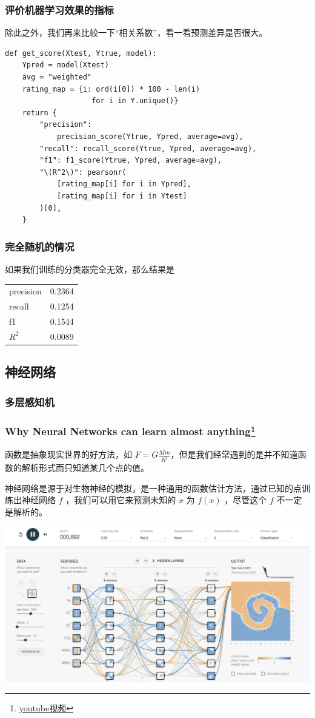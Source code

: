 \documentclass{ctexbeamer}
\begin{document}
\begin{frame}[fragile]
    \frametitle{评价机器学习效果的指标}
    除此之外，我们再来比较一下“相关系数”，看一看预测差异是否很大。
    \begin{verbatim}
def get_score(Xtest, Ytrue, model):
    Ypred = model(Xtest)
    avg = "weighted"
    rating_map = {i: ord(i[0]) * 100 - len(i)
                    for i in Y.unique()}
    return {
        "precision":
            precision_score(Ytrue, Ypred, average=avg),
        "recall": recall_score(Ytrue, Ypred, average=avg),
        "f1": f1_score(Ytrue, Ypred, average=avg),
        "\(R^2\)": pearsonr(
            [rating_map[i] for i in Ypred],
            [rating_map[i] for i in Ytest]
        )[0],
    }
\end{verbatim}
\end{frame}
\begin{frame}
    \frametitle{完全随机的情况}
    如果我们训练的分类器完全无效，那么结果是
    \begin{center}
        \begin{tabular}{ll}
            precision & 0.2364 \\
            recall    & 0.1254 \\
            f1        & 0.1544 \\
            \(R^2\)   & 0.0089 \\
        \end{tabular}
    \end{center}
\end{frame}
\subsection{神经网络}
\subsubsection{多层感知机}
\begin{frame}
    \frametitle{Why Neural Networks can learn almost anything\footnote{\href{https://www.youtube.com/watch?v=0QczhVg5HaI}{youtube视频}}}
    函数是抽象现实世界的好方法，如 \(\displaystyle F=G\frac{Mm}{R^2}\)，但是我们经常遇到的是并不知道函数的解析形式而只知道某几个点的值。

    神经网络是源于对生物神经的模拟，是一种通用的函数估计方法\cite{hornik1989multilayer}，通过已知的点训练出神经网络 $f$ ，我们可以用它来预测未知的 $x$ 为 $f(x)$ ，尽管这个 $f$ 不一定是解析的。

    \begin{center}
        \href{https://playground.tensorflow.org/}{\includegraphics[width=0.7\linewidth]{../lib/tfplay.png}}
    \end{center}
\end{frame}
\end{document}
